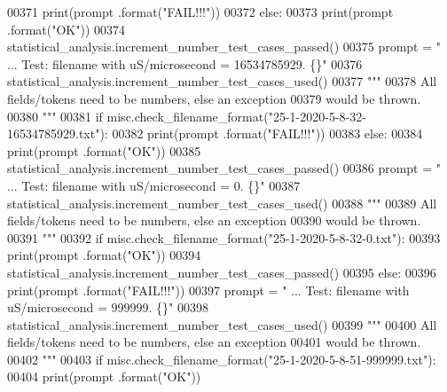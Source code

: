\begin{DoxyCode}
00371             print(prompt .format(\textcolor{stringliteral}{"FAIL!!!"}))
00372         \textcolor{keywordflow}{else}:
00373             print(prompt .format(\textcolor{stringliteral}{"OK"}))
00374             statistical\_analysis.increment\_number\_test\_cases\_passed()
00375         prompt = \textcolor{stringliteral}{"  ... Test: filename with uS/microsecond = 16534785929.   \{\}"}
00376         statistical\_analysis.increment\_number\_test\_cases\_used()
00377         \textcolor{stringliteral}{"""}
00378 \textcolor{stringliteral}{            All fields/tokens need to be numbers, else an exception}
00379 \textcolor{stringliteral}{                would be thrown.}
00380 \textcolor{stringliteral}{        """}
00381         \textcolor{keywordflow}{if} misc.check\_filename\_format(\textcolor{stringliteral}{"25-1-2020-5-8-32-16534785929.txt"}):
00382             print(prompt .format(\textcolor{stringliteral}{"FAIL!!!"}))
00383         \textcolor{keywordflow}{else}:
00384             print(prompt .format(\textcolor{stringliteral}{"OK"}))
00385             statistical\_analysis.increment\_number\_test\_cases\_passed()
00386         prompt = \textcolor{stringliteral}{"  ... Test: filename with uS/microsecond = 0.     \{\}"}
00387         statistical\_analysis.increment\_number\_test\_cases\_used()
00388         \textcolor{stringliteral}{"""}
00389 \textcolor{stringliteral}{            All fields/tokens need to be numbers, else an exception}
00390 \textcolor{stringliteral}{                would be thrown.}
00391 \textcolor{stringliteral}{        """}
00392         \textcolor{keywordflow}{if} misc.check\_filename\_format(\textcolor{stringliteral}{"25-1-2020-5-8-32-0.txt"}):
00393             print(prompt .format(\textcolor{stringliteral}{"OK"}))
00394             statistical\_analysis.increment\_number\_test\_cases\_passed()
00395         \textcolor{keywordflow}{else}:
00396             print(prompt .format(\textcolor{stringliteral}{"FAIL!!!"}))
00397         prompt = \textcolor{stringliteral}{"  ... Test: filename with uS/microsecond = 999999.    \{\}"}
00398         statistical\_analysis.increment\_number\_test\_cases\_used()
00399         \textcolor{stringliteral}{"""}
00400 \textcolor{stringliteral}{            All fields/tokens need to be numbers, else an exception}
00401 \textcolor{stringliteral}{                would be thrown.}
00402 \textcolor{stringliteral}{        """}
00403         \textcolor{keywordflow}{if} misc.check\_filename\_format(\textcolor{stringliteral}{"25-1-2020-5-8-51-999999.txt"}):
00404             print(prompt .format(\textcolor{stringliteral}{"OK"}))

\end{DoxyCode}
